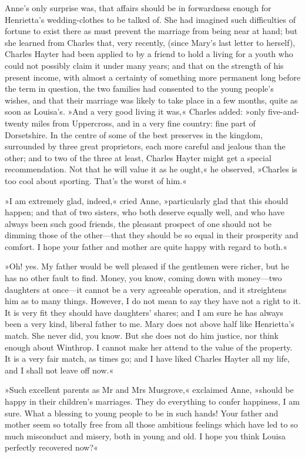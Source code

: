Anne's only surprise was, that affairs should be in forwardness enough for Henrietta's wedding-clothes to be talked of. She had imagined such difficulties of fortune to exist there as must prevent the marriage from being near at hand; but she learned from Charles that, very recently, (since Mary's last letter to herself), Charles Hayter had been applied to by a friend to hold a living for a youth who could not possibly claim it under many years; and that on the strength of his present income, with almost a certainty of something more permanent long before the term in question, the two families had consented to the young people's wishes, and that their marriage was likely to take place in a few months, quite as soon as Louisa's. »And a very good living it was,« Charles added: »only five-and-twenty miles from Uppercross, and in a very fine country: fine part of Dorsetshire. In the centre of some of the best preserves in the kingdom, surrounded by three great proprietors, each more careful and jealous than the other; and to two of the three at least, Charles Hayter might get a special recommendation. Not that he will value it as he ought,« he observed, »Charles is too cool about sporting. That's the worst of him.«

»I am extremely glad, indeed,« cried Anne, »particularly glad that this should happen; and that of two sisters, who both deserve equally well, and who have always been such good friends, the pleasant prospect of one should not be dimming those of the other—that they should be so equal in their prosperity and comfort. I hope your father and mother are quite happy with regard to both.«

»Oh! yes. My father would be well pleased if the gentlemen were richer, but he has no other fault to find. Money, you know, coming down with money—two daughters at once—it cannot be a very agreeable operation, and it streightens him as to many things. However, I do not mean to say they have not a right to it. It is very fit they should have daughters' shares; and I am sure he has always been a very kind, liberal father to me. Mary does not above half like Henrietta's match. She never did, you know. But she does not do him justice, nor think enough about Winthrop. I cannot make her attend to the value of the property. It is a very fair match, as times go; and I have liked Charles Hayter all my life, and I shall not leave off now.«

»Such excellent parents as Mr and Mrs Musgrove,« exclaimed Anne, »should be happy in their children's marriages. They do everything to confer happiness, I am sure. What a blessing to young people to be in such hands! Your father and mother seem so totally free from all those ambitious feelings which have led to so much misconduct and misery, both in young and old. I hope you think Louisa perfectly recovered now?«


